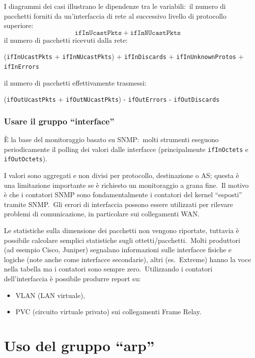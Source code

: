 \noindent I diagrammi dei casi illustrano le dipendenze tra le variabili:\ il numero di pacchetti forniti da un'interfaccia di rete al successivo livello di protocollo superiore: \[\mathtt{ifInUcastPkts} + \mathtt{ifInNUcastPkts}\]
il numero di pacchetti ricevuti dalla rete:
\begin{center}
    (\texttt{ifInUcastPkts} + \texttt{ifInNUcastPkts}) + \texttt{ifInDiscards} + \texttt{ifInUnknownProtos} + \texttt{ifInErrors}
\end{center}
il numero di pacchetti effettivamente trasmessi:
\begin{center}
    (\texttt{ifOutUcastPkts} + \texttt{ifOutNUcastPkts}) - \texttt{ifOutErrors} - \texttt{ifOutDiscards}
\end{center}

\subsubsection{Usare il gruppo ``interface''}

È la base del monitoraggio basato su SNMP:\ molti strumenti eseguono periodicamente il polling dei valori dalle interfacce (principalmente \texttt{ifInOctets} e \texttt{ifOutOctets}).\

I valori sono aggregati e non divisi per protocollo, destinazione o AS; questa è una limitazione importante se è richiesto un monitoraggio a grana fine.\
Il motivo è che i contatori SNMP sono fondamentalmente i contatori del kernel ``esposti'' tramite SNMP.\
Gli errori di interfaccia possono essere utilizzati per rilevare problemi di comunicazione, in particolare sui collegamenti WAN.\

Le statistiche sulla dimensione dei pacchetti non vengono riportate, tuttavia è possibile calcolare semplici statistiche sugli ottetti/pacchetti.\
Molti produttori (ad esempio Cisco, Juniper) segnalano informazioni sulle interfacce fisiche e logiche (note anche come interfacce secondarie), altri (es.\ Extreme) hanno la voce nella tabella ma i contatori sono sempre zero.\
Utilizzando i contatori dell'interfaccia è possibile produrre report su:
\begin{itemize}
    \item VLAN (LAN virtuale),
    \item PVC (circuito virtuale privato) sui collegamenti Frame Relay.
\end{itemize}

\section{Uso del gruppo ``arp''}

